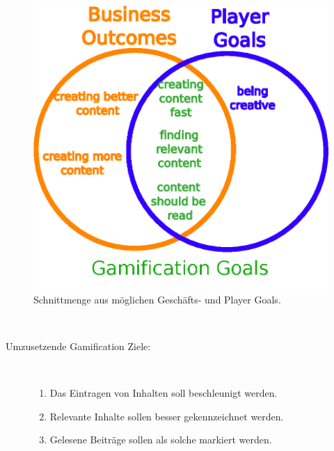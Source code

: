 \documentclass[a4paper,12pt,twoside]{scrartcl}
\begin{document}
\\\\
\begin{figure}[h!]
\begin{center}
\includegraphics[scale = 0.9]{Bilder/Schnittmenge3.eps}
\caption{Schnittmenge aus möglichen Geschäfts- und Player Goals.}
\label{Schnittmenge}
\end{center}
\end{figure}
\\
\begin{description}
   \item[Umzusetzende Gamification Ziele:]~\par
   \begin{enumerate}
      \item Das Eintragen von Inhalten soll beschleunigt werden. 
      \item Relevante Inhalte sollen besser gekennzeichnet werden.
      \item Gelesene Beiträge sollen als solche markiert werden.
   \end{enumerate}
\end{description} 
\end{document}
